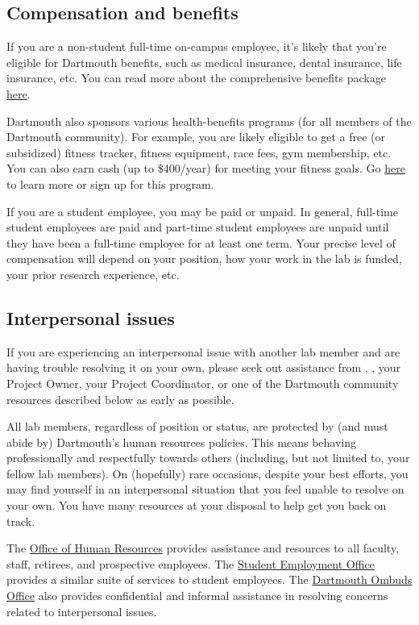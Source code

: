 \documentclass{tufte-book} %
\begin{document}
\subsection{Compensation and benefits}
If you are a non-student full-time on-campus employee, it's likely that
you're eligible for Dartmouth benefits, such as medical insurance,
dental insurance, life insurance, etc.  You can read more about the
comprehensive benefits package \href{http://www.dartmouth.edu/~hrs/benefits/}{here}.

Dartmouth also sponsors various health-benefits programs (for all
members of the Dartmouth community).  For example, you are likely
eligible to get a free (or subsidized) fitness tracker, fitness
equipment, race fees, gym membership, etc.  You can also earn cash (up
to \$400/year) for meeting your fitness goals.  Go
\href{http://join.virginpulse.com/dartmouth/}{here} to learn more or
sign up for this program.

If you are a student employee, you may be paid or unpaid.  In general,
full-time student employees are paid and part-time student employees
are unpaid until they have been a full-time employee for at least one
term.  Your precise level of compensation will depend on your
position, how your work in the lab is funded, your prior research
experience, etc.

\subsection{Interpersonal issues}
 If you are experiencing an
interpersonal issue with another lab member and are having trouble
resolving it on your own, please seek out assistance from \director,
\coordinator, your Project Owner, your Project Coordinator, or one of
the Dartmouth community resources described below as early as possible.

All lab members, regardless of position or status, are protected by
(and must abide by) Dartmouth's human resources policies.  This means
behaving professionally and respectfully towards others (including,
but not limited to, your fellow lab members).  On (hopefully) rare
occasions, despite your best efforts, you may find yourself in an
interpersonal situation that you feel unable to resolve on your own.
You have many resources at your disposal to help get you back on
track.

The \href{http://www.dartmouth.edu/~hrs/}{Office of Human Resources}
provides assistance and resources to all faculty, staff, retirees, and
prospective employees. The
\href{http://www.dartmouth.edu/~seo/}{Student Employment Office}
provides a similar suite of services to student employees.  The
\href{http://www.dartmouth.edu/~ombuds/}{Dartmouth Ombuds Office} also
provides confidential and informal assistance in resolving concerns
related to interpersonal issues.
\end{document}
